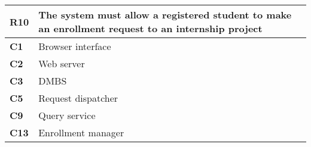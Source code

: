 \begin{table}[H]
    \centering
    \begin{tabular}{|l|m{10cm}|}
        \hline \textbf{R10} & The system must allow a registered student to make an enrollment request to an internship project \\
        \hline \textbf{C1} & Browser interface \\
        \hline \textbf{C2} & Web server \\
        \hline \textbf{C3} & DMBS \\
        \hline \textbf{C5} & Request dispatcher \\
        \hline \textbf{C9} & Query service \\
        \hline \textbf{C13} & Enrollment manager \\
        \hline
    \end{tabular}
\end{table}

